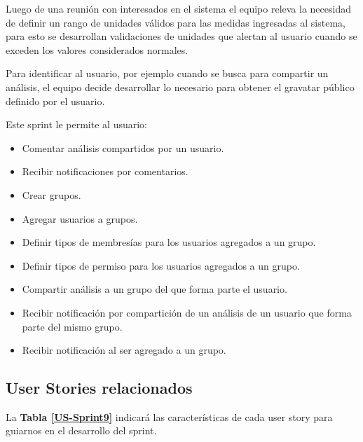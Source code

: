 Luego de una reunión con interesados en el sistema el equipo releva la necesidad de definir un rango de unidades válidos para las medidas ingresadas al sistema, para esto se desarrollan validaciones de unidades que alertan al usuario cuando se exceden los valores considerados normales.

Para identificar al usuario, por ejemplo cuando se busca para compartir un análisis, el equipo decide desarrollar lo necesario para obtener el gravatar público definido por el usuario.

Este sprint le permite al usuario:
	\begin{itemize}
		\item Comentar análisis compartidos por un usuario.
		\item Recibir notificaciones por comentarios.
		\item Crear grupos.
		\item Agregar usuarios a grupos.
		\item Definir tipos de membresías para los usuarios agregados a un grupo.
		\item Definir tipos de permiso para los usuarios agregados a un grupo.
		\item Compartir análisis a un grupo del que forma parte el usuario.
		\item Recibir notificación por compartición de un análisis de un usuario que forma parte del mismo grupo.
		\item Recibir notificación al ser agregado a un grupo.
	\end{itemize}

\subsection{User Stories relacionados}
La \textbf{Tabla \ref{US-Sprint9}} indicará las características de cada user story para guiarnos en el desarrollo del sprint.

